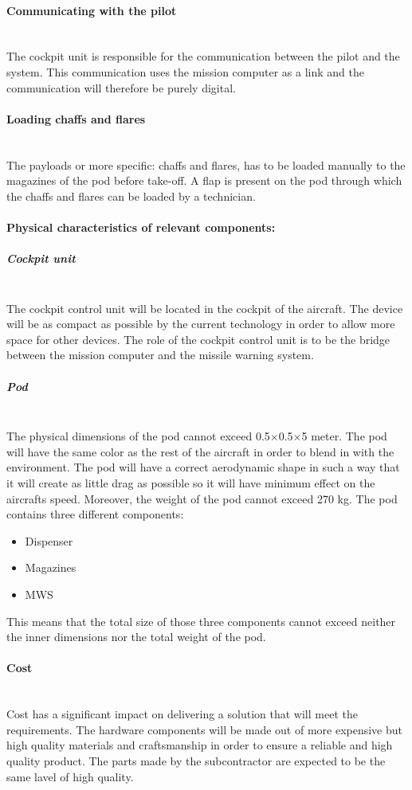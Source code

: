 \paragraph{Communicating with the pilot}  \makebox{} \\
The cockpit unit is responsible for the communication between the pilot and the system. This communication uses the mission computer as a link and the communication will therefore be purely digital.

\paragraph{Loading chaffs and flares}  \makebox{} \\
The payloads or more specific: chaffs and flares, has to be loaded manually to the magazines of the pod before take-off. A flap is present on the pod through which the chaffs and flares can be loaded by a technician.

\paragraph{Physical characteristics of relevant components:} 

\subparagraph{Cockpit unit}  \makebox{} \\
The cockpit control unit will be located in the cockpit of the aircraft. The device will be as compact as possible by the current technology in order to allow more space for other devices. The role of the cockpit control unit is to be the bridge between the mission computer and the missile warning system.

\subparagraph{Pod}  \makebox{} \\
The physical dimensions of the pod cannot exceed 0.5$\times$0.5$\times$5 meter. The pod will have the same color as the rest of the aircraft in order to blend in with the environment. The pod will have a correct aerodynamic shape in such a way that it will create as little drag as possible so it will have minimum effect on the aircrafts speed.  Moreover, the weight of the pod cannot exceed 270 kg.
The pod contains three different components:
\begin{itemize}
\item Dispenser
\item Magazines
\item MWS
\end{itemize}

This means that the total size of those three components cannot exceed neither the inner dimensions nor the total weight of the pod. 

\paragraph{Cost} \makebox{} \\
Cost has a significant impact on delivering a solution that will meet the requirements. The hardware components will be made out of more expensive but high quality materials and craftsmanship in order to ensure a reliable and high quality product. The parts made by the subcontractor are expected to be the same lavel of high quality.  


